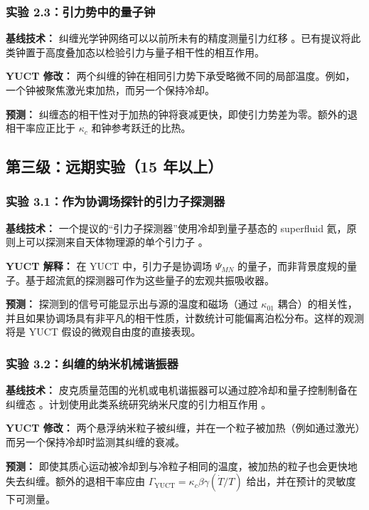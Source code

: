 \documentclass[12pt]{article}
\theoremstyle{remark}
\begin{document}
	\subsubsection{实验 2.3：引力势中的量子钟}
	
	\textbf{基线技术：} 纠缠光学钟网络可以以前所未有的精度测量引力红移 \cite{Katori2021}。已有提议将此类钟置于高度叠加态以检验引力与量子相干性的相互作用。
	
	\textbf{YUCT 修改：} 两个纠缠的钟在相同引力势下承受略微不同的局部温度。例如，一个钟被聚焦激光束加热，而另一个保持冷却。
	
	\textbf{预测：} 纠缠态的相干性对于加热的钟将衰减更快，即使引力势差为零。额外的退相干率应正比于 $\kappa_c$ 和钟参考跃迁的比热。
	
	\subsection{第三级：远期实验（15 年以上）}
	\label{subsec:far-tests}
	
	\subsubsection{实验 3.1：作为协调场探针的引力子探测器}
	
	\textbf{基线技术：} 一个提议的“引力子探测器”使用冷却到量子基态的 superfluid 氦，原则上可以探测来自天体物理源的单个引力子 \cite{Berezin2025}。
	
	\textbf{YUCT 解释：} 在 YUCT 中，引力子是协调场 $\Psi_{MN}$ 的量子，而非背景度规的量子。基于超流氦的探测器可作为这些量子的宏观共振吸收器。
	
	\textbf{预测：} 探测到的信号可能显示出与源的温度和磁场（通过 $\kappa_{01}$ 耦合）的相关性，并且如果协调场具有非平凡的相干性质，计数统计可能偏离泊松分布。这样的观测将是 YUCT 假设的微观自由度的直接表现。
	
	\subsubsection{实验 3.2：纠缠的纳米机械谐振器}
	
	\textbf{基线技术：} 皮克质量范围的光机或电机谐振器可以通过腔冷却和量子控制制备在纠缠态 \cite{Aspelmeyer2014}。计划使用此类系统研究纳米尺度的引力相互作用 \cite{Geraci2010}。
	
	\textbf{YUCT 修改：} 两个悬浮纳米粒子被纠缠，并在一个粒子被加热（例如通过激光）而另一个保持冷却时监测其纠缠的衰减。
	
	\textbf{预测：} 即使其质心运动被冷却到与冷粒子相同的温度，被加热的粒子也会更快地失去纠缠。额外的退相干率应由 $\Gamma_{\mathrm{YUCT}} = \kappa_c \beta\gamma (\dot{T}/T)$ 给出，并在预计的灵敏度下可测量。
	
\end{document}
